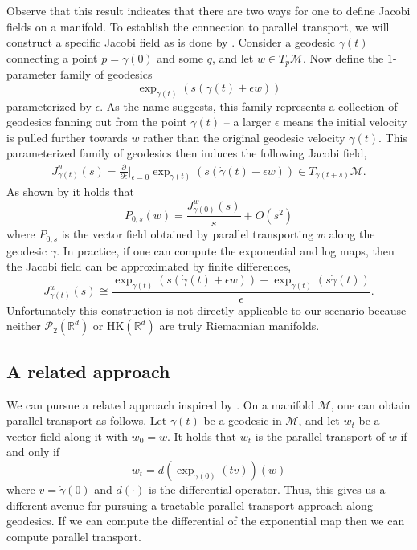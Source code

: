 \documentclass{article}
\newcommand{\man}{\mathcal{M}}
\begin{document}
Observe that this result indicates that there are two ways for one to define Jacobi fields on a manifold. To establish the connection to parallel transport, we will construct a specific Jacobi field as is done by \citet{louis2018fanning}. Consider a geodesic $\gamma(t)$ connecting a point $p = \gamma(0)$ and some $q$, and let $w \in T_p\man$. Now define the $1$-parameter family of geodesics 
\[\exp_{\gamma(t)}(s(\dot{\gamma}(t) + \epsilon w))\]
parameterized by $\epsilon$. As the name  suggests, this family represents a collection of geodesics fanning out from the point $\gamma(t)$ -- a larger $\epsilon$ means the initial velocity is pulled further towards $w$ rather than the original geodesic velocity $\dot{\gamma}(t).$ This parameterized family of geodesics then induces the following Jacobi field,
\begin{align}
    J^{w}_{\gamma(t)}(s) = \frac{\partial}{\partial\epsilon}\bigg|_{\epsilon = 0}\exp_{\gamma(t)}(s(\dot{\gamma}(t) + \epsilon w)) \in T_{\gamma(t+s)}\man.
\end{align}
As shown by \citet{louis2018fanning} it holds that 
\begin{equation}
    P_{0, s}(w) = \frac{J^w_{\gamma(0)}(s)}{s} + O(s^2)
\end{equation}
where $P_{0, s}$ is the vector field obtained by parallel transporting $w$ along the geodesic $\gamma$. In practice, if one can compute the exponential and log maps, then the Jacobi field can be approximated by finite differences,
\[J^w_{\gamma(t)}(s) \cong \frac{\exp_{\gamma(t)}(s(\dot{\gamma}(t) + \epsilon w)) - \exp_{\gamma(t)}(s\dot{\gamma}(t))}{\epsilon}.\]
Unfortunately this construction is not directly applicable to our scenario because neither $\mathcal{P}_2(\mathbb{R}^d)$ or $\text{HK}(\mathbb{R}^d)$ are truly Riemannian manifolds. 

\subsection{A related approach}
We can pursue a related approach inspired by \citet{gigli2012second}. On a manifold $\man$, one can obtain parallel transport as follows. Let $\gamma(t)$ be a geodesic in $\man$, and let $w_t$ be a vector field along it with $w_0 = w$. It holds that $w_t$ is the parallel transport of $w$ if and only if
\[w_t = d(\exp_{\gamma(0)}(tv))(w)\]
where $v = \dot{\gamma}(0)$ and $d(\cdot)$ is the differential operator. Thus, this gives us a different avenue for pursuing a tractable parallel transport approach along geodesics. If we can compute the differential of the exponential map then we can compute parallel transport.
\end{document}
